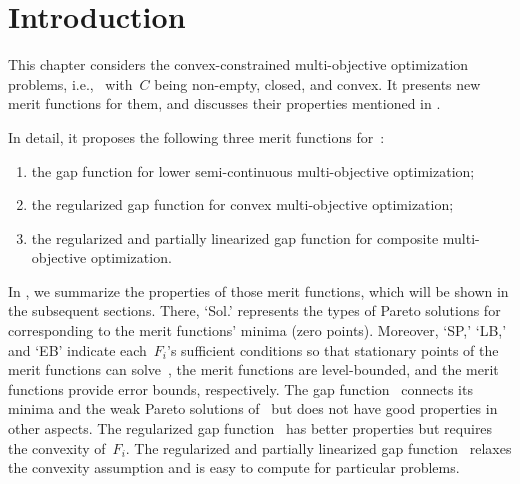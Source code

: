 \documentclass[../main]{subfiles}
\begin{document}
\section{Introduction}
This chapter considers the convex-constrained multi-objective optimization problems, i.e.,~ with~$C$ being non-empty, closed, and convex.
It presents new merit functions for them, and discusses their properties mentioned in .

In detail, it proposes the following three merit functions for~: 
\begin{enumerate}
    \item the gap function for lower semi-continuous multi-objective optimization; 
    \item the regularized gap function for convex multi-objective optimization; 
    \item the regularized and partially linearized gap function for composite multi-objective optimization. 
\end{enumerate}
In , we summarize the properties of those merit functions, which will be shown in the subsequent sections.
There, `Sol.' represents the types of Pareto solutions for~ corresponding to the merit functions' minima (zero points).
Moreover, `SP,' `LB,' and `EB' indicate each~$F_i$'s sufficient conditions so that stationary points of the merit functions can solve~, the merit functions are level-bounded, and the merit functions provide error bounds, respectively.
The gap function~ connects its minima and the weak Pareto solutions of~ but does not have good properties in other aspects.
The regularized gap function~ has better properties but requires the convexity of~$F_i$.
The regularized and partially linearized gap function~ relaxes the convexity assumption and is easy to compute for particular problems.
\end{document}
